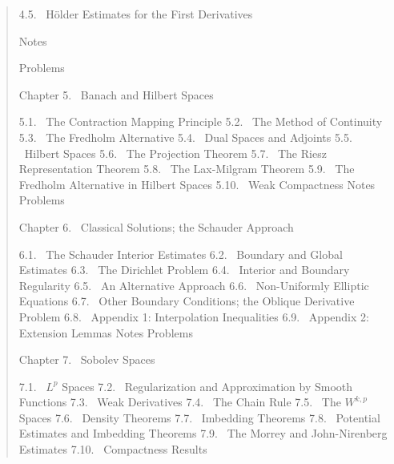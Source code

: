 \begin{quote}
4.5. \ Hölder Estimates for the First Derivatives 

Notes 

Problems 

Chapter 5. \ Banach and Hilbert Spaces 

5.1. \ The Contraction Mapping Principle 
5.2. \ The Method of Continuity 
5.3. \ The Fredholm Alternative 
5.4. \ Dual Spaces and Adjoints 
5.5. \ Hilbert Spaces 
5.6. \ The Projection Theorem 
5.7. \ The Riesz Representation Theorem 
5.8. \ The Lax-Milgram Theorem 
5.9. \ The Fredholm Alternative in Hilbert Spaces 
5.10. \ Weak Compactness 
Notes 
Problems 

Chapter 6. \ Classical Solutions; the Schauder Approach 

6.1. \ The Schauder Interior Estimates 
6.2. \ Boundary and Global Estimates 
6.3. \ The Dirichlet Problem 
6.4. \ Interior and Boundary Regularity 
6.5. \ An Alternative Approach 
6.6. \ Non-Uniformly Elliptic Equations 
6.7. \ Other Boundary Conditions; the Oblique Derivative Problem 
6.8. \ Appendix 1: Interpolation Inequalities 
6.9. \ Appendix 2: Extension Lemmas 
Notes 
Problems 

Chapter 7. \ Sobolev Spaces 

7.1. \ $L^p$ Spaces 
7.2. \ Regularization and Approximation by Smooth Functions 
7.3. \ Weak Derivatives 
7.4. \ The Chain Rule 
7.5. \ The $W^{k,p}$ Spaces 
7.6. \ Density Theorems 
7.7. \ Imbedding Theorems 
7.8. \ Potential Estimates and Imbedding Theorems 
7.9. \ The Morrey and John-Nirenberg Estimates 
7.10. \ Compactness Results 
\end{quote}

